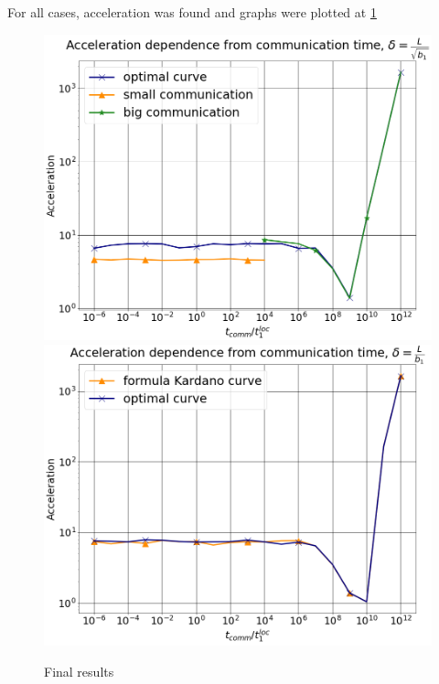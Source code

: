 \documentclass{article}
\begin{document}
For all cases, acceleration was found and graphs were plotted at \ref{ris:image}

\begin{figure}[!ht]
    {\includegraphics[scale = 0.21]{final_graph1.png}}
    {\includegraphics[scale = 0.21]{final_graph2.png}}
    \caption{Final results}
    \label{ris:image}
\end{figure}


\end{document}
